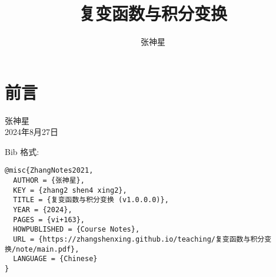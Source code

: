 \documentclass[%
  color=doremi,%
  lang=cn,%
  11pt,%
  chinese,%
  twoside,%
  openright,%
  usesamecnt%
]{elegantbook}
\title{复变函数与积分变换}
\author{张神星}
\institute{合肥工业大学}
\date{\zhtoday}
\begin{document}
\maketitle
\hypersetup{pageanchor=true}
\frontmatter

\chapter*{前言}


\vskip 0.5cm
\begin{flushright}
张神星\\
2024年8月27日
\end{flushright}


\vskip 0.5cm

\noindent Bib 格式:
\begin{lstlisting}
@misc{ZhangNotes2021,
  AUTHOR = {张神星},
  KEY = {zhang2 shen4 xing2},
  TITLE = {复变函数与积分变换 (v1.0.0.0)},
  YEAR = {2024},
  PAGES = {vi+163},
  HOWPUBLISHED = {Course Notes},
  URL = {https://zhangshenxing.github.io/teaching/复变函数与积分变换/note/main.pdf},
  LANGUAGE = {Chinese}
}
\end{lstlisting}

\tableofcontents




\mainmatter
% 

% 
% 


% 


\end{document}
